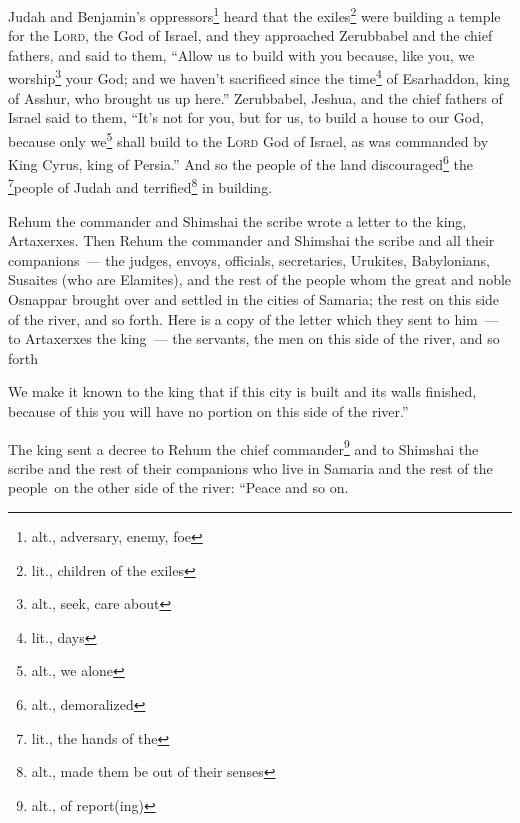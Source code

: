 
\begin{inparaenum}
     Judah and Benjamin's oppressors\footnote{alt., adversary, enemy, foe} heard that the exiles\footnote{lit., children of the exiles} were building a temple for the \textsc{Lord}, the God of Israel,%
     and they approached Zerubbabel and the chief fathers, and said to them, ``Allow us to build with you because, like you, we worship\footnote{alt., seek, care about} your God; and we haven't sacrificed since the time\footnote{lit., days} of Esarhaddon, king of Asshur, who brought us up here.''%
     Zerubbabel, Jeshua, and the chief fathers of Israel said to them, ``It's not for you, but for us, to build a house to our God, because only we\footnote{alt., we alone} shall build to the \textsc{Lord} God of Israel, as was commanded by King Cyrus, king of Persia.''%
     And so the people of the land discouraged\footnote{alt., demoralized} the \footnote{lit., the hands of the}people of Judah and terrified\footnote{alt., made them be out of their senses} in building.%
    
    
     Rehum the commander and Shimshai the scribe wrote a letter to the king, Artaxerxes.%
     Then Rehum the commander and Shimshai the scribe and all their companions~--- the judges, envoys, officials, secretaries, Urukites, Babylonians, Susaites (who are Elamites),%
     and the rest of the people whom the great and noble Osnappar brought over and settled in the cities of Samaria; the rest on this side of the river, and so forth.%
     Here is a copy of the letter which they sent to him~--- to Artaxerxes the king~--- the servants, the men on this side of the river, and so forth%
    
     We make it known to the king that if this city is built and its walls finished, because of this you will have no portion on this side of the river.''%
    
     The king sent a decree to Rehum the chief commander\footnote{alt., of report(ing)} and to Shimshai the scribe and the rest of their companions who live in Samaria and the rest of the people\understood\ on the other side of the river: ``Peace and so on.%
    

\end{inparaenum}
